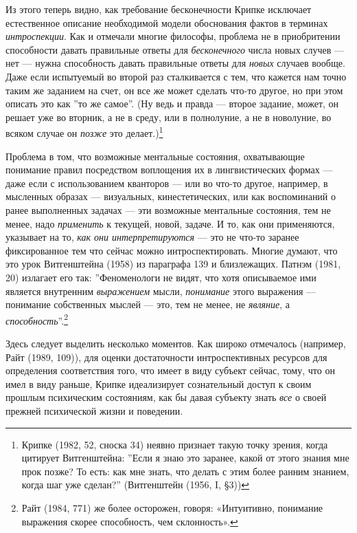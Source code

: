 \documentclass[12pt]{book}
\begin{document}
Из этого теперь видно, как требование бесконечности Крипке исключает естественное описание необходимой модели обоснования фактов в терминах \textit{интроспекции}. Как и отмечали многие философы, проблема не в приобритении способности давать правильные ответы для \textit{бесконечного} числа новых случев --- нет --- нужна способность давать правильные ответы для \textit{новых} случаев вообще. Даже если испытуемый во второй раз сталкивается с тем, что кажется нам точно таким же заданием на счет, он все же может сделать что-то другое, но при этом описать это как ''то же самое''. (Ну ведь и правда --- второе задание, может, он решает уже во вторник, а не в среду, или в полнолуние, а не в новолуние, во всяком случае он \textit{позже} это делает.)\footnote{Крипке (1982, 52, сноска 34) неявно признает такую точку зрения, когда цитирует Витгенштейна: ''Если я знаю это заранее, какой от этого знания мне прок позже? То есть: как мне знать, что делать с этим более ранним знанием, когда шаг уже сделан?'' (Витгенштейн (1956, I, §3))}

Проблема в том, что возможные ментальные состояния, охватывающие понимание правил посредством воплощения их в лингвистических формах --- даже если с использованием кванторов --- или во что-то другое, например, в мысленных образах --- визуальных, кинестетических, или как воспоминаний о ранее выполненных задачах --- эти возможные ментальные состояния, тем не менее, надо \textit{применить} к текущей, новой, задаче. И то, как они применяются, указывает на то, \textit{как они интерпретируются} --- это не что-то заранее фиксированное тем что сейчас можно интроспектировать. Многие думают, что это урок Витгенштейна (1958) из параграфа 139 и близлежащих. Патнэм (1981, 20) излагает его так: ''Феноменологи не видят, что хотя описываемое ими является внутренним \textit{выражением} мысли, \textit{понимание} этого выражения --- понимание собственных мыслей --- это, тем не менее, не \textit{являние}, а \textit{способность}''.\footnote{Райт (1984, 771) же более осторожен, говоря: «Интуитивно, понимание выражения скорее способность, чем склонность».}

Здесь следует выделить несколько моментов. Как широко отмечалось (например, Райт (1989, 109)), для оценки достаточности интроспективных ресурсов для определения соответствия того, что имеет в виду субъект сейчас, тому, что он имел в виду раньше, Крипке идеализирует сознательный доступ к своим прошлым психическим состояниям, как бы давая субъекту знать \textit{все} о своей прежней психической жизни и поведении.
\end{document}

